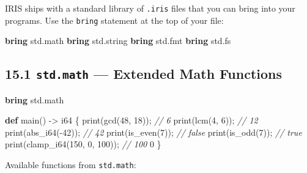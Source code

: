 \documentclass[
  english,
]{book}
\newenvironment{Shaded}{\begin{snugshade}}{\end{snugshade}}
\newcommand{\CommentTok}[1]{\textcolor[rgb]{0.42,0.60,0.33}{\textit{#1}}}
\newcommand{\DataTypeTok}[1]{\textcolor[rgb]{0.31,0.79,0.69}{#1}}
\newcommand{\DecValTok}[1]{\textcolor[rgb]{0.71,0.81,0.66}{#1}}
\newcommand{\FunctionTok}[1]{\textcolor[rgb]{0.86,0.86,0.67}{#1}}
\newcommand{\KeywordTok}[1]{\textcolor[rgb]{0.34,0.61,0.84}{\textbf{#1}}}
\newcommand{\NormalTok}[1]{\textcolor[rgb]{0.83,0.83,0.83}{#1}}
\newcommand{\OperatorTok}[1]{\textcolor[rgb]{0.83,0.83,0.83}{#1}}
\begin{document}
IRIS ships with a standard library of \texttt{.iris} files that you can
bring into your programs. Use the \texttt{bring} statement at the top of
your file:

\begin{Shaded}
\begin{Highlighting}[]
\KeywordTok{bring}\NormalTok{ std}\OperatorTok{.}\NormalTok{math}
\KeywordTok{bring}\NormalTok{ std}\OperatorTok{.}\NormalTok{string}
\KeywordTok{bring}\NormalTok{ std}\OperatorTok{.}\NormalTok{fmt}
\KeywordTok{bring}\NormalTok{ std}\OperatorTok{.}\NormalTok{fs}
\end{Highlighting}
\end{Shaded}

\subsection{\texorpdfstring{15.1 \texttt{std.math} --- Extended Math
Functions}{15.1 std.math --- Extended Math Functions}}\label{std.math-extended-math-functions}

\begin{Shaded}
\begin{Highlighting}[]
\KeywordTok{bring}\NormalTok{ std}\OperatorTok{.}\NormalTok{math}

\KeywordTok{def}\NormalTok{ main() }\OperatorTok{{-}\textgreater{}} \DataTypeTok{i64}\NormalTok{ \{}
    \FunctionTok{print}\NormalTok{(gcd(}\DecValTok{48}\NormalTok{, }\DecValTok{18}\NormalTok{));           }\CommentTok{// 6}
    \FunctionTok{print}\NormalTok{(lcm(}\DecValTok{4}\NormalTok{, }\DecValTok{6}\NormalTok{));             }\CommentTok{// 12}
    \FunctionTok{print}\NormalTok{(abs\_i64(}\OperatorTok{{-}}\DecValTok{42}\NormalTok{));          }\CommentTok{// 42}
    \FunctionTok{print}\NormalTok{(is\_even(}\DecValTok{7}\NormalTok{));            }\CommentTok{// false}
    \FunctionTok{print}\NormalTok{(is\_odd(}\DecValTok{7}\NormalTok{));             }\CommentTok{// true}
    \FunctionTok{print}\NormalTok{(clamp\_i64(}\DecValTok{150}\NormalTok{, }\DecValTok{0}\NormalTok{, }\DecValTok{100}\NormalTok{)); }\CommentTok{// 100}
    \DecValTok{0}
\NormalTok{\}}
\end{Highlighting}
\end{Shaded}

Available functions from \texttt{std.math}:
\end{document}
